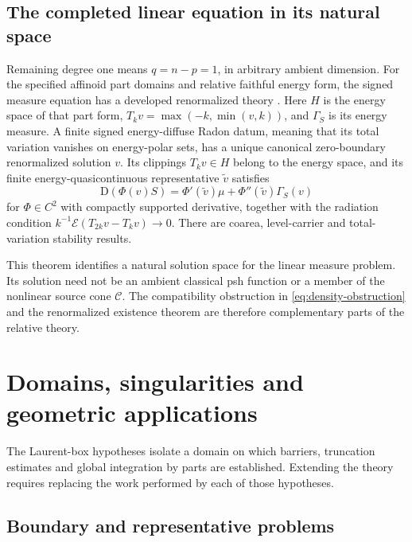 \documentclass[11pt,a4paper]{article}
\newcommand{\MathEqref}[1]{{\hypersetup{linkcolor=EquationLink}\eqref{#1}}}
\theoremstyle{definition}
\theoremstyle{remark}
\numberwithin{equation}{section}
\newcommand{\D}{\mathrm D}
\newcommand{\C}{\mathscr C}
\begin{document}
\subsection{The completed linear equation in its natural space}

Remaining degree one means $q=n-p=1$, in arbitrary ambient dimension.
For the specified affinoid part domains and relative faithful energy
form, the signed measure equation has a developed renormalized theory
\cite{Rchain,Mature}.  Here $H$ is the energy space of that part form,
$T_kv=\max(-k,\min(v,k))$, and $\Gamma_S$ is its energy measure.
A finite signed energy-diffuse Radon datum, meaning that its total
variation vanishes on energy-polar sets, has a
unique canonical zero-boundary renormalized solution $v$.  Its
clippings $T_kv\in H$ belong to the energy space, and its finite
energy-quasicontinuous representative $\widetilde v$ satisfies
\begin{equation}
 \D(\Phi(v)S)=\Phi'(\widetilde v)\mu+
                           \Phi''(\widetilde v)\Gamma_S(v)
                         \label{eq:renormalized-chain}
\end{equation}
for $\Phi\in C^2$ with compactly supported derivative, together with
the radiation condition
$k^{-1}\mathcal E(T_{2k}v-T_kv)\to0$.
There are coarea, level-carrier and total-variation stability results.

This theorem identifies a natural solution space for the linear
measure problem.  Its solution need not be an ambient classical psh
function or a member of the nonlinear source cone $\C$.  The
compatibility obstruction in \MathEqref{eq:density-obstruction} and
the renormalized existence theorem are therefore complementary parts
of the relative theory.

\section{Domains, singularities and geometric applications}
\label{sec:applications}

The Laurent-box hypotheses isolate a domain on which barriers,
truncation estimates and global integration by parts are established.
Extending the theory requires replacing the work performed by each
of those hypotheses.

\subsection{Boundary and representative problems}
\end{document}
